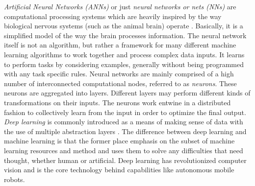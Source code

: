 \documentclass[12pt,a4paper,table,dvipsnames,tikz]{report}
\newcommand{\term}{\textit}
\newcommand{\acronym}{\MakeUppercase}
\begin{document}
	\term{Artificial Neural Networks (\acronym{ann}s)} or just \term{neural networks 
	or nets	(\acronym{nn}s)} are computational processing systems which are heavily 
	inspired by the way biological nervous systems (such as the animal brain) operate 
	\citep{Shea}. Basically, it is a simplified model of the way the brain processes 
	information. The neural network itself is not an algorithm, but rather a framework 
	for many different machine learning algorithms to work together and process 
	complex data inputs. It learns to perform tasks by considering examples, generally 
	without being programmed with any task specific rules. Neural networks are mainly 
	comprised of a high number of interconnected computational nodes, referred to as 
	\term{neurons}. These neurons are aggregated into layers. Different layers may 
	perform different kinds of transformations on their inputs. The neurons work 
	entwine in a distributed fashion to collectively learn from the input in order 
	to optimize the final output.
	\\
	
	\term{Deep learning} is commonly introduced as a means of making sense of data 
	with the use of multiple abstraction layers \citep{Shabbir}. The difference 
	between deep learning and machine learning is that the former place emphasis on 
	the subset of machine learning resources and method and uses them to solve any 
	difficulties that need thought, whether human or artificial. Deep learning has 
	revolutionized computer vision and is the core technology behind capabilities 
	like autonomous mobile robots.
	\\
	
\end{document}
